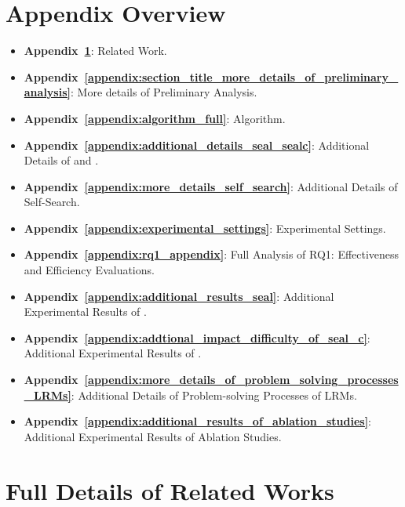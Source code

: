 \section*{Appendix Overview}
\begin{itemize}[leftmargin=*]
\item \textbf{Appendix~\ref{appendix:related_works}}: Related Work.
\item \textbf{Appendix~\ref{appendix:section_title_more_details_of_preliminary_analysis}}: More details of Preliminary Analysis.
\item \textbf{Appendix~\ref{appendix:algorithm_full}}: Algorithm.
\item \textbf{Appendix~\ref{appendix:additional_details_seal_sealc}}: Additional Details of \method and \cmethod.
\item \textbf{Appendix~\ref{appendix:more_details_self_search}}: Additional Details of Self-Search.
\item \textbf{Appendix~\ref{appendix:experimental_settings}}: Experimental Settings.
\item \textbf{Appendix~\ref{appendix:rq1_appendix}}: Full Analysis of RQ1: Effectiveness and Efficiency Evaluations.


\item \textbf{Appendix~\ref{appendix:additional_results_seal}}: Additional Experimental Results of \method.
\item \textbf{Appendix~\ref{appendix:addtional_impact_difficulty_of_seal_c}}: Additional Experimental Results of \cmethod.
\item \textbf{Appendix~\ref{appendix:more_details_of_problem_solving_processes_LRMs}}: Additional Details of Problem-solving Processes of LRMs.
\item \textbf{Appendix~\ref{appendix:additional_results_of_ablation_studies}}: Additional Experimental Results of Ablation Studies.
\end{itemize}


\section{Full Details of Related Works}
\label{appendix:related_works}
